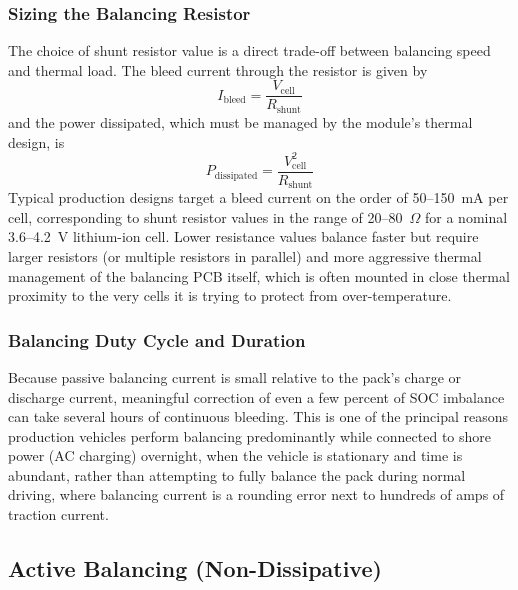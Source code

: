 \subsubsection{Sizing the Balancing Resistor}
\label{subsubsec:14_resistor_sizing}

The choice of shunt resistor value is a direct trade-off between balancing speed and thermal load. The bleed current through the resistor is given by
\begin{equation}
    I_{\text{bleed}} = \frac{V_{\text{cell}}}{R_{\text{shunt}}}
    \label{eq:14_bleed_current}
\end{equation}
and the power dissipated, which must be managed by the module's thermal design, is
\begin{equation}
    P_{\text{dissipated}} = \frac{V_{\text{cell}}^2}{R_{\text{shunt}}}
    \label{eq:14_bleed_power}
\end{equation}
Typical production designs target a bleed current on the order of 50–150~mA per cell, corresponding to shunt resistor values in the range of 20–80~$\Omega$ for a nominal 3.6–4.2~V lithium-ion cell. Lower resistance values balance faster but require larger resistors (or multiple resistors in parallel) and more aggressive thermal management of the balancing PCB itself, which is often mounted in close thermal proximity to the very cells it is trying to protect from over-temperature.

\subsubsection{Balancing Duty Cycle and Duration}
\label{subsubsec:14_duty_cycle}

Because passive balancing current is small relative to the pack's charge or discharge current, meaningful correction of even a few percent of SOC imbalance can take several hours of continuous bleeding. This is one of the principal reasons production vehicles perform balancing predominantly while connected to shore power (AC charging) overnight, when the vehicle is stationary and time is abundant, rather than attempting to fully balance the pack during normal driving, where balancing current is a rounding error next to hundreds of amps of traction current.

\subsection{Active Balancing (Non-Dissipative)}
\label{subsec:14_active}


